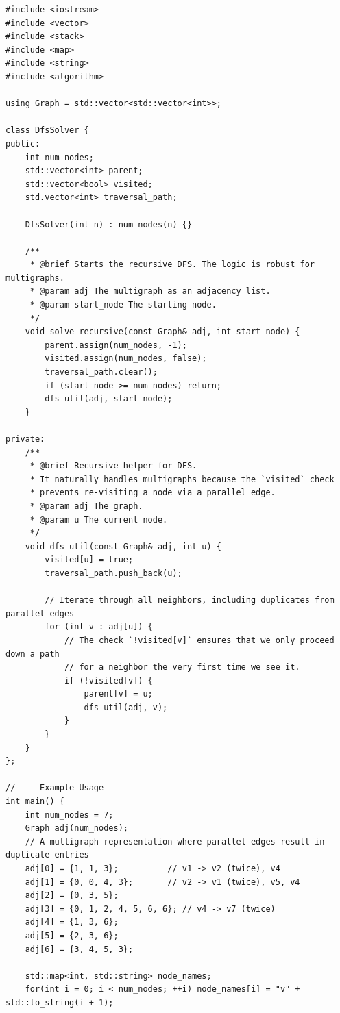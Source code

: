 \documentclass[a4paper,12pt]{article}
\begin{document}
\begin{lstlisting}[style=cppstyle, caption={Cài đặt DFS cho đa đồ thị trong C++.}, label={lst:cpp_dfs_12}]
#include <iostream>
#include <vector>
#include <stack>
#include <map>
#include <string>
#include <algorithm>

using Graph = std::vector<std::vector<int>>;

class DfsSolver {
public:
    int num_nodes;
    std::vector<int> parent;
    std::vector<bool> visited;
    std.vector<int> traversal_path;

    DfsSolver(int n) : num_nodes(n) {}

    /**
     * @brief Starts the recursive DFS. The logic is robust for multigraphs.
     * @param adj The multigraph as an adjacency list.
     * @param start_node The starting node.
     */
    void solve_recursive(const Graph& adj, int start_node) {
        parent.assign(num_nodes, -1);
        visited.assign(num_nodes, false);
        traversal_path.clear();
        if (start_node >= num_nodes) return;
        dfs_util(adj, start_node);
    }

private:
    /**
     * @brief Recursive helper for DFS.
     * It naturally handles multigraphs because the `visited` check
     * prevents re-visiting a node via a parallel edge.
     * @param adj The graph.
     * @param u The current node.
     */
    void dfs_util(const Graph& adj, int u) {
        visited[u] = true;
        traversal_path.push_back(u);
        
        // Iterate through all neighbors, including duplicates from parallel edges
        for (int v : adj[u]) {
            // The check `!visited[v]` ensures that we only proceed down a path
            // for a neighbor the very first time we see it.
            if (!visited[v]) {
                parent[v] = u;
                dfs_util(adj, v);
            }
        }
    }
};

// --- Example Usage ---
int main() {
    int num_nodes = 7;
    Graph adj(num_nodes);
    // A multigraph representation where parallel edges result in duplicate entries
    adj[0] = {1, 1, 3};          // v1 -> v2 (twice), v4
    adj[1] = {0, 0, 4, 3};       // v2 -> v1 (twice), v5, v4
    adj[2] = {0, 3, 5};
    adj[3] = {0, 1, 2, 4, 5, 6, 6}; // v4 -> v7 (twice)
    adj[4] = {1, 3, 6};
    adj[5] = {2, 3, 6};
    adj[6] = {3, 4, 5, 3};

    std::map<int, std::string> node_names;
    for(int i = 0; i < num_nodes; ++i) node_names[i] = "v" + std::to_string(i + 1);
    

\end{lstlisting}
\end{document}
